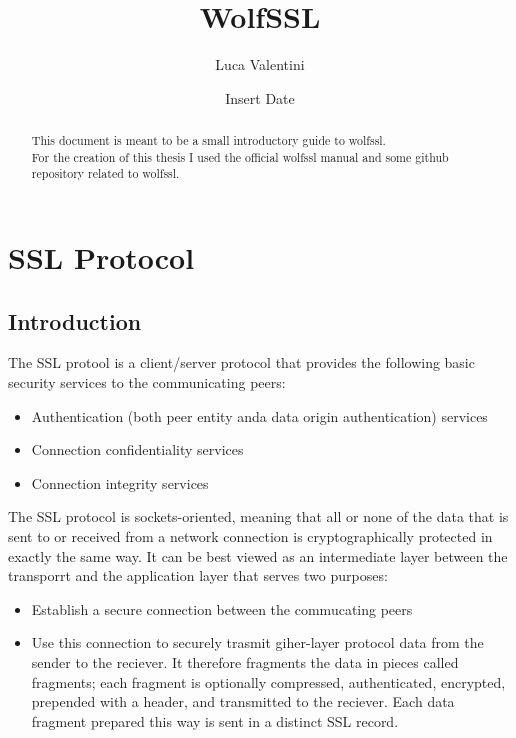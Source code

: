 \documentclass[a4paper,12pt]{report}
\title{WolfSSL}
\author{Luca Valentini}
\date{Insert Date}
\begin{document}
\maketitle
\tableofcontents



\newpage
\begin{abstract}
This document is meant to be a small introductory guide to wolfssl.
\\For the creation of this thesis I used the official wolfssl manual and some github repository related to wolfssl.
\end{abstract}


\chapter{SSL Protocol}

\section{Introduction}
The SSL protool is a client/server protocol that provides the following basic security services to the communicating peers:
\begin{itemize}
	\item Authentication (both peer entity anda data origin authentication) services
	\item Connection confidentiality services
	\item Connection integrity services
\end{itemize}

The SSL protocol is sockets-oriented, meaning that all or none of the data that is sent to or received from a network connection is cryptographically protected in exactly the same way. It can be best viewed as an intermediate layer between the transporrt and the application layer that serves two purposes:
\begin{itemize}
	\item Establish a secure connection between the commucating peers
	\item Use this connection to securely trasmit giher-layer protocol data from the sender to the reciever. It therefore fragments the data in pieces called fragments; each fragment is optionally compressed, authenticated, encrypted, prepended with a header, and transmitted to the reciever. Each data fragment prepared this way is sent in a distinct SSL record.
\end{itemize}
\end{document}
